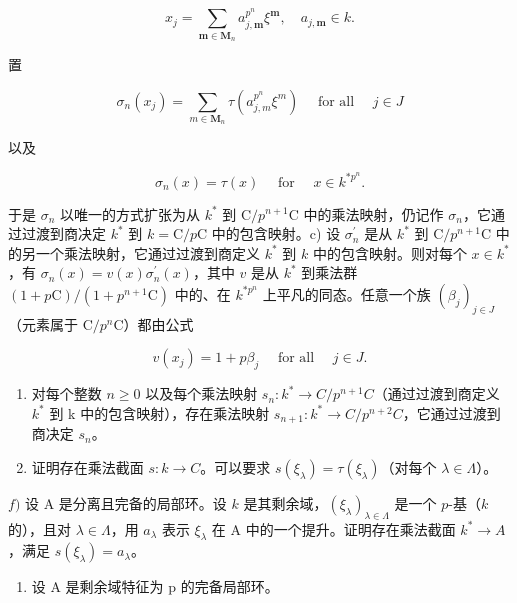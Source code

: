 \[
x _ {j} = \sum_ {\boldsymbol {m} \in \mathbf {M} _ {n}} a _ {j, \boldsymbol {m}} ^ {p ^ {n}} \xi^ {\boldsymbol {m}}, \quad a _ {j, \boldsymbol {m}} \in k.
\]

置

\[
\sigma_ {n} (x _ {j}) = \sum_ {m \in \mathbf {M} _ {n}} \tau (a _ {j, m} ^ {p ^ {n}} \xi^ {m}) \quad \text { for all } \quad j \in J
\]

以及

\[
\sigma_ {n} (x) = \tau (x) \quad \text { for } \quad x \in k ^ {* p ^ {n}}.
\]

于是 \(\sigma_{n}\) 以唯一的方式扩张为从 \(k^{*}\) 到 \(\mathrm{C} / p^{n + 1}\mathrm{C}\) 中的乘法映射，仍记作 \(\sigma_{n}\)，它通过过渡到商决定 \(k^{*}\) 到 \(k = \mathrm{C} / p\mathrm{C}\) 中的包含映射。c) 设 \(\sigma_{n}^{\prime}\) 是从 \(k^{*}\) 到 \(\mathrm{C} / p^{n + 1}\mathrm{C}\) 中的另一个乘法映射，它通过过渡到商定义 \(k^{*}\) 到 \(k\) 中的包含映射。则对每个 \(x\in k^{*}\)，有 \(\sigma_{n}(x) = v(x)\sigma_{n}^{\prime}(x)\)，其中 \(v\) 是从 \(k^{*}\) 到乘法群 \((1 + p\mathrm{C}) / (1 + p^{n + 1}\mathrm{C})\) 中的、在 \(k^{*p^n}\) 上平凡的同态。任意一个族 \((\beta_j)_{j\in J}\)（元素属于 \(\mathrm{C} / p^n\mathrm{C}\)）都由公式

\[
v (x _ {j}) = 1 + p \beta_ {j} \quad \text { for all } \quad j \in J.
\]

\begin{enumerate}
\def\labelenumi{\alph{enumi})}
\setcounter{enumi}{3}
\item
  对每个整数 \(n \geqslant 0\) 以及每个乘法映射 \(s_{n}: k^{*} \to C/p^{n+1}C\)（通过过渡到商定义 \(k^{*}\) 到 k 中的包含映射），存在乘法映射 \(s_{n+1}: k^{*} \to C/p^{n+2}C\)，它通过过渡到商决定 \(s_{n}\)。
\item
  证明存在乘法截面 \(s:k\to C\)。可以要求 \(s(\xi_{\lambda})=\tau(\xi_{\lambda})\)（对每个 \(\lambda\in\Lambda\)）。
\end{enumerate}

\(f)\) 设 A 是分离且完备的局部环。设 \(k\) 是其剩余域，\((\xi_{\lambda})_{\lambda \in \Lambda}\) 是一个 \(p\)-基（\(k\) 的），且对 \(\lambda \in \Lambda\)，用 \(a_{\lambda}\) 表示 \(\xi_{\lambda}\) 在 A 中的一个提升。证明存在乘法截面 \(k^{*} \to A\)，满足 \(s(\xi_{\lambda}) = a_{\lambda}\)。

\begin{enumerate}
\def\labelenumi{\arabic{enumi})}
\setcounter{enumi}{11}
\tightlist
\item
  设 A 是剩余域特征为 p 的完备局部环。
\end{enumerate}


